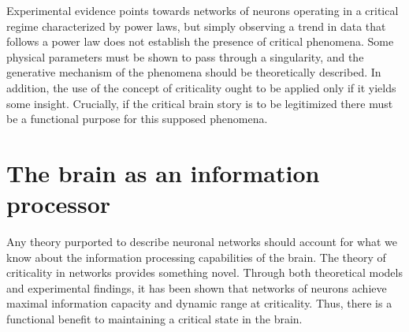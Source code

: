 \documentclass[12pt]{article}
\begin{document}
Experimental evidence points towards networks of neurons operating in a critical regime characterized by power laws, but simply observing a trend in data that follows a power law does not establish the presence of critical phenomena. Some physical parameters must be shown to pass through a singularity, and the generative mechanism of the phenomena should be theoretically described. In addition, the use of the concept of criticality ought to be applied only if it yields some insight. Crucially, if the critical brain story is to be legitimized there must be a functional purpose for this supposed phenomena. 
      
\section*{The brain as an information processor}

Any theory purported to describe neuronal networks should account for what we know about the information processing capabilities of the brain. The theory of criticality in networks provides something novel. Through both theoretical models and experimental findings, it has been shown that networks of neurons achieve maximal information capacity and dynamic range at criticality. Thus, there is a functional benefit to maintaining a critical state in the brain.
\end{document}
